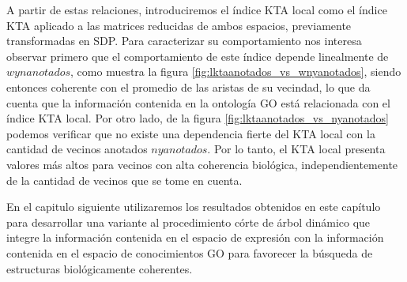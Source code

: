 A partir de estas relaciones, introduciremos el índice KTA local como el índice KTA aplicado a las matrices reducidas de ambos espacios, previamente transformadas en SDP. Para caracterizar su comportamiento nos interesa observar primero que el comportamiento de este índice depende linealmente de $wynanotados$, como muestra la figura \ref{fig:lktaanotados_vs_wnyanotados}, siendo entonces coherente con el promedio de las aristas de su vecindad, lo que da cuenta que la información contenida en la ontología GO está relacionada con el índice KTA local. Por otro lado, de la figura \ref{fig:lktaanotados_vs_nyanotados} podemos verificar que no existe una dependencia fierte del KTA local con la cantidad de vecinos anotados $nyanotados$. Por lo tanto, el KTA local presenta valores más altos para vecinos con alta coherencia biológica, independientemente de la cantidad de vecinos que se tome en cuenta.

En el capitulo siguiente utilizaremos los resultados obtenidos en este capítulo para desarrollar una variante al procedimiento córte de árbol dinámico que integre la información contenida en el espacio de expresión con la información contenida en el espacio de conocimientos GO para favorecer la búsqueda de estructuras biológicamente coherentes.
